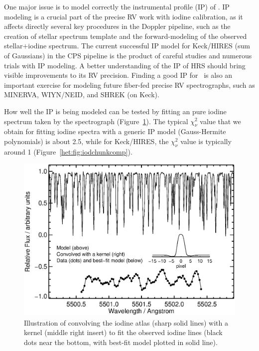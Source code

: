
One major issue is to model correctly the instrumental profile (IP) of
\het. IP modeling is a crucial part of the precise RV work with iodine
calibration, as it affects directly several key procedures in the
Doppler pipeline, such as the creation of stellar spectrum template
and the forward-modeling of the observed stellar$+$iodine
spectrum. The current
successful IP model for Keck/HIRES (sum of Gaussians) in the CPS
pipeline is the product of careful studies and numerous trials with IP
modeling. A better understanding of the IP of HRS should bring visible
improvements to its RV precision. Finding a good IP for \het\ is also
an important exercise for modeling future fiber-fed precise RV
spectrographs, such as MINERVA, WIYN/NEID, and SHREK (on Keck).

How well the IP is being modeled can be tested by fitting an pure
iodine spectrum taken by the spectrograph
(Figure~\ref{het:fig:convkernel}). The typical $\chi_\nu^2$ value that
we obtain for fitting iodine spectra with a generic IP model
(Gauss-Hermite polynomials) is about 2.5, while for Keck/HIRES, the
$\chi_\nu^2$ value is typically around 1
(Figure~\ref{het:fig:iodchunkcomp}).


\begin{figure}
\centering
\includegraphics[scale=0.45]{het/convolution_kernel.eps}
\caption{Illustration of convolving the iodine atlas (sharp solid
  lines) with a kernel (middle right insert) to fit the observed
  iodine lines (black dots near the bottom, with best-fit model
  plotted in solid line).
\label{het:fig:convkernel}}
\end{figure}




